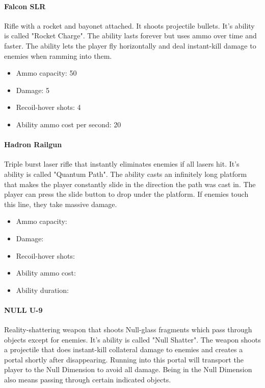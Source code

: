\documentclass[12pt]{article}
\begin{document}
\paragraph{Falcon SLR}

Rifle with a rocket and bayonet attached. It shoots projectile bullets. It's ability is called "Rocket Charge". The ability lasts forever but uses ammo over time and faster. The ability lets the player fly horizontally and deal instant-kill damage to enemies when ramming into them.

\begin{itemize}
	\item Ammo capacity: 50
	\item Damage: 5
	\item Recoil-hover shots: 4
	\item Ability ammo cost per second: 20
\end{itemize} 


\paragraph{Hadron Railgun}

Triple burst laser rifle that instantly eliminates enemies if all lasers hit. It's ability is called "Quantum Path". The ability casts an infinitely long platform that makes the player constantly slide in the direction the path was cast in. The player can press the slide button to drop under the platform. If enemies touch this line, they take massive damage. 


\begin{itemize}
	\item Ammo capacity: 
	\item Damage: 
	\item Recoil-hover shots: 
	\item Ability ammo cost: 
	\item Ability duration: 
\end{itemize}


\paragraph{NULL U-9}

Reality-shattering weapon that shoots Null-glass fragments which pass through objects except for enemies. It's ability is called "Null Shatter". The weapon shoots a projectile that does instant-kill collateral damage to enemies and creates a portal shortly after disappearing. Running into this portal will transport the player to the Null Dimension to avoid all damage. Being in the Null Dimension also means passing through certain indicated objects. 
\end{document}
